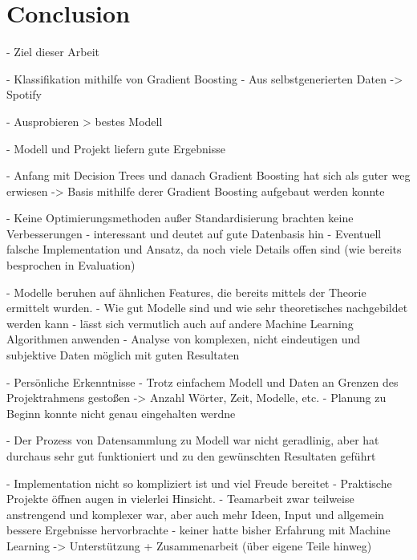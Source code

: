\section{Conclusion}

- Ziel dieser Arbeit 

    - Klassifikation mithilfe von Gradient Boosting 
    - Aus selbstgenerierten Daten -> Spotify

    - Ausprobieren > bestes Modell 

- Modell und Projekt liefern gute Ergebnisse 

    - Anfang mit Decision Trees und danach Gradient Boosting hat sich als guter weg erwiesen
        -> Basis mithilfe derer Gradient Boosting aufgebaut werden konnte 

    - Keine Optimierungsmethoden außer Standardisierung brachten keine Verbesserungen
        - interessant und deutet auf gute Datenbasis hin 
        - Eventuell falsche Implementation und Ansatz, da noch viele Details offen sind (wie bereits besprochen in Evaluation)

    - Modelle beruhen auf ähnlichen Features, die bereits mittels der Theorie ermittelt wurden. 
        - Wie gut Modelle sind und wie sehr theoretisches nachgebildet werden kann
        - lässt sich vermutlich auch auf andere Machine Learning Algorithmen anwenden 
            - Analyse von komplexen, nicht eindeutigen und subjektive Daten möglich mit guten Resultaten 

-   Persönliche Erkenntnisse
    - Trotz einfachem Modell und Daten an Grenzen des Projektrahmens gestoßen -> Anzahl Wörter, Zeit, Modelle, etc. 
        - Planung zu Beginn konnte nicht genau eingehalten werdne 

    - Der Prozess von Datensammlung zu Modell war nicht geradlinig, aber hat durchaus sehr gut funktioniert und zu den 
      gewünschten Resultaten geführt 

    - Implementation nicht so kompliziert ist und viel Freude bereitet
    - Praktische Projekte öffnen augen in vielerlei Hinsicht. 
    - Teamarbeit zwar teilweise anstrengend und komplexer war, aber auch mehr Ideen, Input und allgemein bessere Ergebnisse hervorbrachte 
        - keiner hatte bisher Erfahrung mit Machine Learning -> Unterstützung  + Zusammenarbeit (über eigene Teile hinweg)


